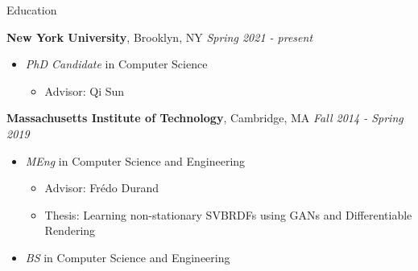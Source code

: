 \documentclass{resume}
\author{Budmonde Duinkharjav}
\begin{document}
\maketitle

\begin{area}{Education}
    \item
        \textbf{New York University}, Brooklyn, NY \hfill \emph{Spring 2021 - present}
        \begin{itemize}
            \item
                \emph{PhD Candidate} in Computer Science
                \begin{itemize}
                    \item Advisor: Qi Sun
                \end{itemize}
        \end{itemize}
    \item
        \textbf{Massachusetts Institute of Technology}, Cambridge, MA \hfill \emph{Fall 2014 - Spring 2019}
        \begin{itemize}
            \item
                \emph{MEng} in Computer Science and Engineering
                \begin{itemize}
                    \item Advisor: Fr\'edo Durand
                    \item Thesis: Learning non-stationary SVBRDFs using GANs and Differentiable Rendering
                \end{itemize}
            \item 
                \emph{BS} in Computer Science and Engineering
        \end{itemize}
\end{area}
\end{document}

